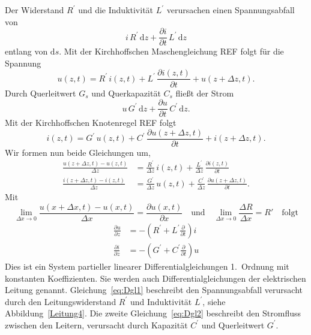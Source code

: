 \documentclass[paper=a4, parskip=half-, ngerman, fontsize=11pt]{scrreprt}
\begin{document}
Der Widerstand $R^{\prime}$ und die Induktivität $L^{\prime}$ verursachen einen Spannungsabfall von
\[
i \, R^{\prime} \, \mathrm{d}z + \frac{\partial i}{\partial t} \, L^{\prime} \, \mathrm{d} z
\]
entlang von $\mathrm{d}s$. Mit der Kirchhoffschen Maschengleichung {\color{red}REF} folgt für die Spannung
\begin{equation}
u(z, t) = R^{\prime} \, i(z, t) + L^{\prime} \, \frac{\partial i(z, t)}{\partial t} + u(z + \Delta z, t).
\end{equation}
Durch Querleitwert $G_{s}$ und Querkapazität $C_{s}$ fließt der Strom
\[
u \, G^{\prime} \, \mathrm{d}z + \frac{\partial u}{\partial t} \, C^{\prime} \, \mathrm{d} z.
\]
Mit der Kirchhoffschen Knotenregel {\color{red}REF} folgt
\begin{equation}
    i(z, t) = G^{\prime} \, u(z, t) + C^{\prime} \, \frac{\partial u(z + \Delta z, t)}{\partial t} + i(z + \Delta z, t).
\end{equation}
Wir formen nun beide Gleichungen um,
\begin{align}
\frac{u(z + \Delta z, t) - u(z, t)}{\Delta z} &= \frac{R^{\prime}}{\Delta z} \, i(z, t) + \frac{L^{\prime}}{\Delta z}
\,
\frac{\partial i(z, t)}{\partial t} \\
\frac{i(z + \Delta z, t) - i(z, t)}{\Delta z} &= \frac{G^{\prime}}{\Delta z} \, u(z, t) + \frac{C^{\prime}}{\Delta z}
\, \frac{\partial u(z + \Delta z, t)}{\partial t}.
\end{align}
Mit
\[
\lim_{\Delta x \to 0} \frac{u(x+\Delta x, t)-u(x, t)}{\Delta x} = \frac{\partial u(x, t)}{\partial x} \quad \text{und}
\quad \lim_{\Delta x \to 0} \frac{\Delta R}{\Delta x} = R' \quad \text{folgt}
\]
\begin{align}
    \frac{\partial u}{\partial z} &= -\left(R^{\prime} + L^{\prime}\frac{\partial}{\partial t}\right)i \label{eq:Dgl1}
    \\
    \frac{\partial i}{\partial z} &= -\left(G^{\prime} + C^{\prime}\frac{\partial}{\partial t}\right)u \label{eq:Dgl2}
\end{align}
Dies ist ein System partieller linearer Differentialgleichungen 1.~Ordnung mit konstanten Koeffizienten. Sie werden
auch Differentialgleichungen der elektrischen Leitung genannt.
Gleichung~\eqref{eq:Dgl1} beschreibt den Spannungsabfall verursacht durch den Leitungswiderstand $R^{\prime}$ und
Induktivität $L^{\prime}$, siehe Abbildung~\ref{Leitung4}.
Die zweite Gleichung~\eqref{eq:Dgl2} beschreibt den Stromfluss zwischen den Leitern, verursacht durch Kapazität
$C^{\prime}$ und Querleitwert $G^{\prime}$.
\end{document}
